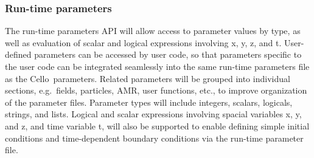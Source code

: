 \documentclass[11pt,letterpaper]{article}
\newcommand{\cello}{\textsf{Cello}}
\newcommand{\code}[1]{\textsf{#1}}
\begin{document}


\subsubsection{Run-time parameters} \label{sss:design-parameters}


The run-time parameters API will allow access to parameter values by
type, as well as evaluation of scalar and logical expressions
involving \code{x}, \code{y}, \code{z}, and \code{t}.  User-defined
parameters can be accessed by user code, so that parameters specific
to the user code can be integrated seamlessly into the same run-time
parameters file as the \cello\ parameters.  Related parameters will be
grouped into individual sections, e.g.~fields, particles, AMR, user
functions, etc., to improve organization of the parameter files.
Parameter types will include integers, scalars, logicals, strings, and
lists.  Logical and scalar expressions involving spacial variables
\code{x}, \code{y}, and \code{z}, and time variable \code{t}, will
also be supported to enable defining simple initial conditions and
time-dependent boundary conditions via the run-time parameter file.
\end{document}
